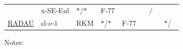 \documentclass[]{book}
\theoremstyle{definition}
\theoremstyle{definition}
\theoremstyle{definition}
\theoremstyle{remark}
\begin{document}
\begin{longtable}[]{@{}llllllc@{}}
\begin{minipage}[t]{0.06\columnwidth}
\end{minipage} & \begin{minipage}[t]{0.10\columnwidth}\raggedright
x-SE-Eul\strut
\end{minipage} & \begin{minipage}[t]{0.05\columnwidth}\raggedright
\(*\)/\(*\)\strut
\end{minipage} & \begin{minipage}[t]{0.06\columnwidth}\raggedright
F-77\strut
\end{minipage} & \begin{minipage}[t]{0.41\columnwidth}\raggedright
\strut
\end{minipage} & \begin{minipage}[t]{0.05\columnwidth}\centering
\(\phantom{*}\)/\(\phantom{\cdot}\)\strut
\end{minipage}\tabularnewline
\begin{minipage}[t]{0.06\columnwidth}\raggedright
\href{http://www.unige.ch/~hairer/prog/stiff/radau.f}{RADAU}\strut
\end{minipage} & \begin{minipage}[t]{0.06\columnwidth}\raggedright
sl-\(\nu\)-\(1\)\strut
\end{minipage} & \begin{minipage}[t]{0.10\columnwidth}\raggedright
RKM\strut
\end{minipage} & \begin{minipage}[t]{0.05\columnwidth}\raggedright
\(*\)/\(*\)\strut
\end{minipage} & \begin{minipage}[t]{0.06\columnwidth}\raggedright
F-77\strut
\end{minipage} & \begin{minipage}[t]{0.41\columnwidth}\raggedright
\strut
\end{minipage} & \begin{minipage}[t]{0.05\columnwidth}\centering
\(*\)/\(\phantom{\cdot}\)\strut
\end{minipage}\tabularnewline
\bottomrule
\end{longtable}

Notes:
\end{document}
